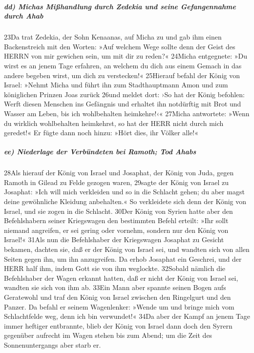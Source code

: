 \hypertarget{dd-michas-miuxdfhandlung-durch-zedekia-und-seine-gefangennahme-durch-ahab}{%
\subparagraph{dd) Michas Mißhandlung durch Zedekia und seine
Gefangennahme durch
Ahab}\label{dd-michas-miuxdfhandlung-durch-zedekia-und-seine-gefangennahme-durch-ahab}}

23Da trat Zedekia, der Sohn Kenaanas, auf Micha zu und gab ihm einen
Backenstreich mit den Worten: »Auf welchem Wege sollte denn der Geist
des HERRN von mir gewichen sein, um mit dir zu reden?« 24Micha
entgegnete: »Du wirst es an jenem Tage erfahren, an welchem du dich aus
einem Gemach in das andere begeben wirst, um dich zu verstecken!«
25Hierauf befahl der König von Israel: »Nehmt Micha und führt ihn zum
Stadthauptmann Amon und zum königlichen Prinzen Joas zurück 26und meldet
dort: ›So hat der König befohlen: Werft diesen Menschen ins Gefängnis
und erhaltet ihn notdürftig mit Brot und Wasser am Leben, bis ich
wohlbehalten heimkehre!‹« 27Micha antwortete: »Wenn du wirklich
wohlbehalten heimkehrst, so hat der HERR nicht durch mich geredet!« Er
fügte dann noch hinzu: »Hört dies, ihr Völker alle!«

\hypertarget{ee-niederlage-der-verbuxfcndeten-bei-ramoth-tod-ahabs}{%
\subparagraph{ee) Niederlage der Verbündeten bei Ramoth; Tod
Ahabs}\label{ee-niederlage-der-verbuxfcndeten-bei-ramoth-tod-ahabs}}

28Als hierauf der König von Israel und Josaphat, der König von Juda,
gegen Ramoth in Gilead zu Felde gezogen waren, 29sagte der König von
Israel zu Josaphat: »Ich will mich verkleiden und so in die Schlacht
gehen; du aber magst deine gewöhnliche Kleidung anbehalten.« So
verkleidete sich denn der König von Israel, und sie zogen in die
Schlacht. 30Der König von Syrien hatte aber den Befehlshabern seiner
Kriegswagen den bestimmten Befehl erteilt: »Ihr sollt niemand angreifen,
er sei gering oder vornehm, sondern nur den König von Israel!« 31Als nun
die Befehlshaber der Kriegswagen Josaphat zu Gesicht bekamen, dachten
sie, daß er der König von Israel sei, und wandten sich von allen Seiten
gegen ihn, um ihn anzugreifen. Da erhob Josaphat ein Geschrei, und der
HERR half ihm, indem Gott sie von ihm weglockte. 32Sobald nämlich die
Befehlshaber der Wagen erkannt hatten, daß er nicht der König von Israel
sei, wandten sie sich von ihm ab. 33Ein Mann aber spannte seinen Bogen
aufs Geratewohl und traf den König von Israel zwischen den Ringelgurt
und den Panzer. Da befahl er seinem Wagenlenker: »Wende um und bringe
mich vom Schlachtfelde weg, denn ich bin verwundet!« 34Da aber der Kampf
an jenem Tage immer heftiger entbrannte, blieb der König von Israel dann
doch den Syrern gegenüber aufrecht im Wagen stehen bis zum Abend; um die
Zeit des Sonnenuntergangs aber starb er.

